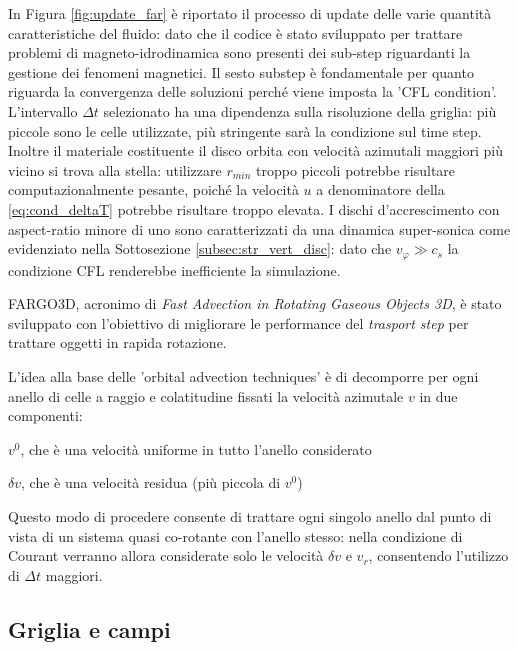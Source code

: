 In Figura \ref{fig:update_far} è riportato il processo di update delle varie quantità caratteristiche del fluido: dato che il codice è stato sviluppato per trattare problemi di magneto-idrodinamica sono presenti dei sub-step riguardanti la gestione dei fenomeni magnetici.
Il sesto substep è fondamentale per quanto riguarda la convergenza delle soluzioni perché viene imposta la 'CFL condition'.
L'intervallo $\Delta t$ selezionato ha una dipendenza sulla risoluzione della griglia: più piccole sono le celle utilizzate, più stringente sarà la condizione sul time step.
Inoltre il materiale costituente il disco orbita con velocità azimutali maggiori più vicino si trova alla stella: utilizzare $r_{min}$ troppo piccoli potrebbe risultare computazionalmente pesante, poiché la velocità $u$ a denominatore della \eqref{eq:cond_deltaT} potrebbe risultare troppo elevata.
I dischi d'accrescimento con aspect-ratio minore di uno sono caratterizzati da una dinamica super-sonica come evidenziato nella Sottosezione \ref{subsec:str_vert_disc}: dato che $v_{\varphi} \gg c_s$ la condizione CFL renderebbe inefficiente la simulazione.

FARGO3D, acronimo di \textit{Fast Advection in Rotating Gaseous Objects 3D}, è stato sviluppato con l'obiettivo di migliorare le performance del \textit{trasport step} per trattare oggetti in rapida rotazione.

L'idea alla base delle 'orbital advection techniques' è di decomporre per ogni anello di celle a raggio e colatitudine fissati la velocità azimutale $v$ in due componenti:
\begin{list}{\textbf{-}}{\setlength{\itemsep}{0cm}}
    \item $v^0$, che è una velocità uniforme in tutto l'anello considerato
    \item $\delta v$, che è una velocità residua (più piccola di $v^0$)
\end{list}
Questo modo di procedere consente di trattare ogni singolo anello dal punto di vista di un sistema quasi co-rotante con l'anello stesso: nella condizione di Courant verranno allora considerate solo le velocità $\delta v$ e $v_r$, consentendo l'utilizzo di $\Delta t$ maggiori.

\subsection{Griglia e campi} \label{subsec:MeshField}

